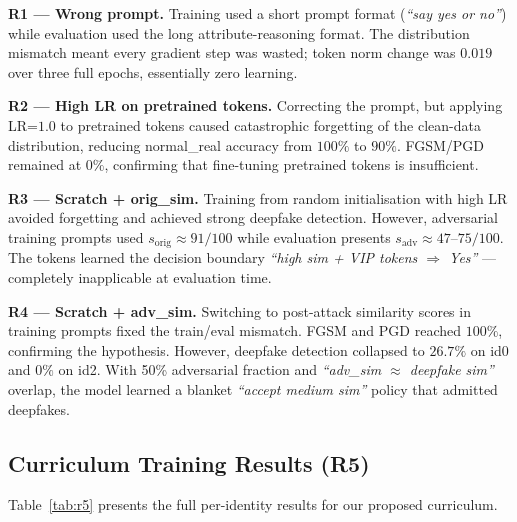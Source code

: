\documentclass[12pt,a4paper]{article}
\begin{document}
\textbf{R1 --- Wrong prompt.}  Training used a short prompt format (\emph{``say yes
or no''}) while evaluation used the long attribute-reasoning format.  The
distribution mismatch meant every gradient step was wasted; token norm change
was $0.019$ over three full epochs, essentially zero learning.

\textbf{R2 --- High LR on pretrained tokens.}  Correcting the prompt, but applying
LR=$1.0$ to pretrained tokens caused catastrophic forgetting of the clean-data
distribution, reducing normal\_real accuracy from $100\%$ to $90\%$.  FGSM/PGD
remained at $0\%$, confirming that fine-tuning pretrained tokens is insufficient.

\textbf{R3 --- Scratch + orig\_sim.}  Training from random initialisation with high
LR avoided forgetting and achieved strong deepfake detection.  However,
adversarial training prompts used $s_{\text{orig}} \approx 91/100$ while
evaluation presents $s_{\text{adv}} \approx 47$--$75/100$.  The tokens learned
the decision boundary \emph{``high sim + VIP tokens $\Rightarrow$ Yes''} ---
completely inapplicable at evaluation time.

\textbf{R4 --- Scratch + adv\_sim.}  Switching to post-attack similarity scores
in training prompts fixed the train/eval mismatch.  FGSM and PGD reached
$100\%$, confirming the hypothesis.  However, deepfake detection collapsed to
$26.7\%$ on id0 and $0\%$ on id2.  With 50\% adversarial fraction and
\emph{``adv\_sim $\approx$ deepfake sim''} overlap, the model learned a blanket
\emph{``accept medium sim''} policy that admitted deepfakes.

\subsection{Curriculum Training Results (R5)}

Table~\ref{tab:r5} presents the full per-identity results for our proposed
curriculum.
\end{document}

